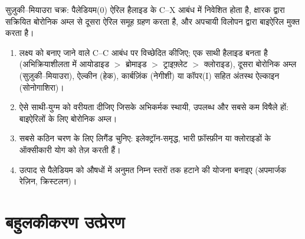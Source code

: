 \begin{omfigure}

{\small सुज़ुकी--मियाउरा चक्र: पैलेडियम(0) ऐरिल हैलाइड के C--X आबंध में
निवेशित होता है, क्षारक द्वारा सक्रियित बोरोनिक अम्ल से दूसरा ऐरिल समूह
ग्रहण करता है, और अपचायी विलोपन द्वारा बाइऐरिल मुक्त करता है।}
\end{omfigure}

\begin{method}[क्रॉस-युग्मन का चयन]\label{met:b3:homogeneous-catalysis:choose-coupling}
\begin{enumerate}
  \item लक्ष्य को बनाए जाने वाले C--C आबंध पर विच्छेदित कीजिए; एक साथी
        हैलाइड बनता है (अभिक्रियाशीलता में आयोडाइड $>$ ब्रोमाइड $>$ ट्राइफ़्लेट $>$ क्लोराइड), दूसरा
        बोरोनिक अम्ल (सुज़ुकी--मियाउरा), ऐल्कीन (हेक), कार्बज़िंक
        (नेगीशी) या कॉपर(I) सहित अंतस्थ ऐल्काइन (सोनोगाशिरा)।
  \item ऐसे साथी-युग्म को वरीयता दीजिए जिसके अभिकर्मक स्थायी, उपलब्ध और सबसे कम
        विषैले हों: बाइऐरिलों के लिए बोरोनिक अम्ल।
  \item सबसे कठिन चरण के लिए लिगैंड चुनिए: इलेक्ट्रॉन-समृद्ध, भारी फ़ॉस्फ़ीन
        या  क्लोराइडों के ऑक्सीकारी योग को तेज़ करती हैं।
  \item उत्पाद से पैलेडियम को औषधों में अनुमत निम्न स्तरों तक हटाने की योजना
        बनाइए (अपमार्जक रेज़िन, क्रिस्टलन)।
\end{enumerate}
\end{method}

\section{बहुलकीकरण उत्प्रेरण}

